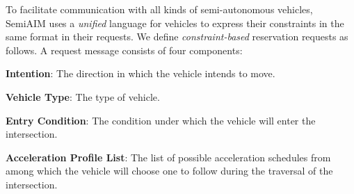 % 
% 
To facilitate communication with all kinds of
semi-autonomous vehicles, SemiAIM uses a \emph{unified}
language for vehicles to express their constraints in the same format
in their requests.  We define \emph{constraint-based} reservation
requests as follows.  A request message consists of four components:
\begin{small_ind_s_itemize}
\item{\bf Intention}: The direction in which the vehicle intends to
  move.
\item{\bf Vehicle Type}: The type of vehicle.
\item{\bf Entry Condition}: The condition under which the vehicle
  will enter the intersection.
\item{\bf Acceleration Profile List}: The list of possible acceleration schedules
  from among which the vehicle will choose one to follow
  during the traversal of the intersection.
\end{small_ind_s_itemize}
